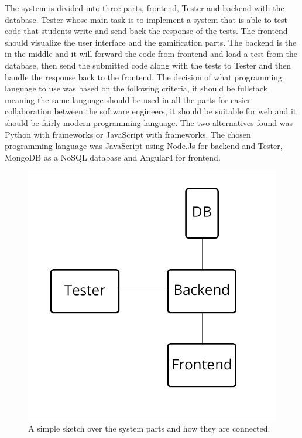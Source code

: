 
The system is divided into three parts, frontend, Tester and backend with the database. Tester whose main task is to implement a system that is able to test code that students write and send back the response of the tests. The frontend should visualize the user interface and the gamification parts. The backend is the in the middle and it will forward the code from frontend and load a test from the database, then send the submitted code along with the tests to Tester and then handle the response back to the frontend. The decision of what programming language to use was based on the following criteria, it should be fullstack meaning the same language should be used in all the parts for easier collaboration between the software engineers, it should be suitable for web and it should be fairly modern programming language. The two alternatives found was Python with frameworks or JavaScript with frameworks. The chosen programming language was JavaScript using Node.Js for backend and Tester, MongoDB as a NoSQL database and Angular4 for frontend.
\begin{figure}[hb]
    \centering
    \includegraphics[scale=0.4]{img/SystemA2.png}
    \caption{A simple sketch over the system parts and how they are connected.}
\end{figure}
